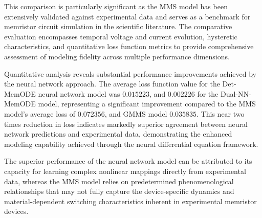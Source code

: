 \documentclass[lettersize,journal]{IEEEtran}
\begin{document}
This comparison is particularly significant as the MMS model has been extensively validated against experimental data and serves as a benchmark for memristor circuit simulation in the scientific literature. The comparative evaluation encompasses temporal voltage and current evolution, hysteretic characteristics, and quantitative loss function metrics to provide comprehensive assessment of modeling fidelity across multiple performance dimensions.

Quantitative analysis reveals substantial performance improvements achieved by the neural network approach. The average loss function value for the Det-MemODE neural network model was \(0.015223\), and \(0.002226\) for the Dual-NN-MemODE model, representing a significant improvement compared to the MMS model's average loss of \(0.072356\), and GMMS model \(0.035835\). This near two times reduction in loss indicates markedly superior agreement between neural network predictions and experimental data, demonstrating the enhanced modeling capability achieved through the neural differential equation framework.


The superior performance of the neural network model can be attributed to its capacity for learning complex nonlinear mappings directly from experimental data, whereas the MMS model relies on predetermined phenomenological relationships that may not fully capture the device-specific dynamics and material-dependent switching characteristics inherent in experimental memristor devices.
\newcommand{\redbar}{\protect\tikz[baseline=-0.1ex]\fill[ieeered] (0,0) rectangle (0.8em,1.2ex);}\newcommand{\bluebar}{\protect\tikz[baseline=-0.1ex]\fill[ieeeblue] (0,0) rectangle (0.8em,1.2ex);}
\newcommand{\greenbar}{\protect\tikz[baseline=-0.1ex]\fill[ieeegreen] (0,0) rectangle (0.8em,1.2ex);}
\end{document}
